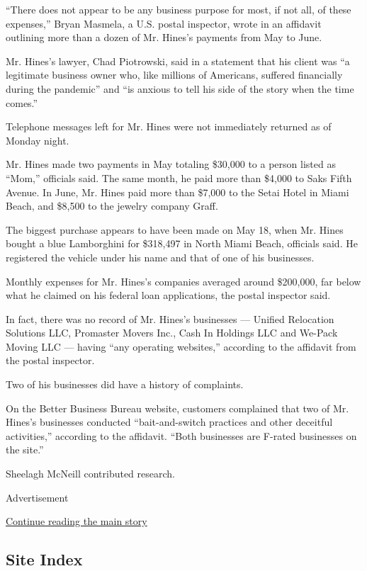 ``There does not appear to be any business purpose for most, if not all,
of these expenses,'' Bryan Masmela, a U.S. postal inspector, wrote in an
affidavit outlining more than a dozen of Mr. Hines's payments from May
to June.

Mr. Hines's lawyer, Chad Piotrowski, said in a statement that his client
was ``a legitimate business owner who, like millions of Americans,
suffered financially during the pandemic'' and ``is anxious to tell his
side of the story when the time comes.''

Telephone messages left for Mr. Hines were not immediately returned as
of Monday night.

Mr. Hines made two payments in May totaling \$30,000 to a person listed
as ``Mom,'' officials said. The same month, he paid more than \$4,000 to
Saks Fifth Avenue. In June, Mr. Hines paid more than \$7,000 to the
Setai Hotel in Miami Beach, and \$8,500 to the jewelry company Graff.

The biggest purchase appears to have been made on May 18, when Mr. Hines
bought a blue Lamborghini for \$318,497 in North Miami Beach, officials
said. He registered the vehicle under his name and that of one of his
businesses.

Monthly expenses for Mr. Hines's companies averaged around \$200,000,
far below what he claimed on his federal loan applications, the postal
inspector said.

In fact, there was no record of Mr. Hines's businesses --- Unified
Relocation Solutions LLC, Promaster Movers Inc., Cash In Holdings LLC
and We-Pack Moving LLC --- having ``any operating websites,'' according
to the affidavit from the postal inspector.

Two of his businesses did have a history of complaints.

On the Better Business Bureau website, customers complained that two of
Mr. Hines's businesses conducted ``bait-and-switch practices and other
deceitful activities,'' according to the affidavit. ``Both businesses
are F-rated businesses on the site.''

Sheelagh McNeill contributed research.

Advertisement

\protect\hyperlink{after-bottom}{Continue reading the main story}

\hypertarget{site-index}{%
\subsection{Site Index}\label{site-index}}

